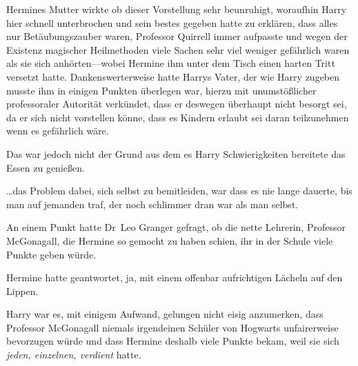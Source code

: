 Hermines Mutter wirkte ob dieser Vorstellung sehr beunruhigt, woraufhin Harry hier schnell unterbrochen und sein bestes gegeben hatte zu erklären, dass alles nur Betäubungszauber waren, Professor Quirrell immer aufpasste und wegen der Existenz magischer Heilmethoden viele Sachen sehr viel weniger gefährlich waren als sie sich anhörten—wobei Hermine ihm unter dem Tisch einen harten Tritt versetzt hatte. Dankenswerterweise hatte Harrys Vater, der wie Harry zugeben musste ihm in einigen Punkten überlegen war, hierzu mit unumstößlicher professoraler Autorität verkündet, dass er deswegen überhaupt nicht besorgt sei, da er sich nicht vorstellen könne, dass es Kindern erlaubt sei daran teilzunehmen wenn es gefährlich wäre.

Das war jedoch nicht der Grund aus dem es Harry Schwierigkeiten bereitete das Essen zu genießen.

…das Problem dabei, sich selbst zu bemitleiden, war dass es nie lange dauerte, bis man auf jemanden traf, der noch schlimmer dran war als man selbst.

An einem Punkt hatte Dr~Leo Granger gefragt, ob die nette Lehrerin, Professor McGonagall, die Hermine so gemocht zu haben schien, ihr in der Schule viele Punkte geben würde.

Hermine hatte geantwortet, ja, mit einem offenbar aufrichtigen Lächeln auf den Lippen.

Harry war es, mit einigem Aufwand, gelungen nicht eisig anzumerken, dass Professor McGonagall niemals irgendeinen Schüler von Hogwarts unfairerweise bevorzugen würde und dass Hermine deshalb viele Punkte bekam, weil sie sich \emph{jeden, einzelnen, verdient} hatte.

